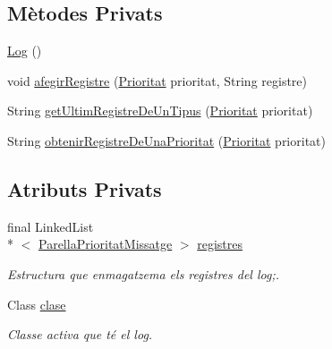 \subsection*{Mètodes Privats}
\begin{DoxyCompactItemize}
\item 
\hyperlink{classlogica_1_1log_1_1_log_adc9a45a8ec3ac28cf225a470febef462}{Log} ()
\item 
void \hyperlink{classlogica_1_1log_1_1_log_a0fd4f6a2a166181957954fd0dbcb516e}{afegir\+Registre} (\hyperlink{enumlogica_1_1log_1_1_log_1_1_prioritat}{Prioritat} prioritat, String registre)
\item 
String \hyperlink{classlogica_1_1log_1_1_log_a9cbdafd1efe82a9210251544c7fce63a}{get\+Ultim\+Registre\+De\+Un\+Tipus} (\hyperlink{enumlogica_1_1log_1_1_log_1_1_prioritat}{Prioritat} prioritat)
\item 
String \hyperlink{classlogica_1_1log_1_1_log_aa79bf08fdc7ff52a24d979d14bb082b0}{obtenir\+Registre\+De\+Una\+Prioritat} (\hyperlink{enumlogica_1_1log_1_1_log_1_1_prioritat}{Prioritat} prioritat)
\end{DoxyCompactItemize}
\subsection*{Atributs Privats}
\begin{DoxyCompactItemize}
\item 
\hypertarget{classlogica_1_1log_1_1_log_a075fe817fdb417775e67909399d8437c}{final Linked\+List\\*
$<$ \hyperlink{classlogica_1_1log_1_1_log_1_1_parella_prioritat_missatge}{Parella\+Prioritat\+Missatge} $>$ \hyperlink{classlogica_1_1log_1_1_log_a075fe817fdb417775e67909399d8437c}{registres}}\label{classlogica_1_1log_1_1_log_a075fe817fdb417775e67909399d8437c}

\begin{DoxyCompactList}\small\item\em Estructura que enmagatzema els registres del log;. \end{DoxyCompactList}\item 
\hypertarget{classlogica_1_1log_1_1_log_af7d3b68ff7c0d75c4bfda5364b37b2ad}{Class \hyperlink{classlogica_1_1log_1_1_log_af7d3b68ff7c0d75c4bfda5364b37b2ad}{clase}}\label{classlogica_1_1log_1_1_log_af7d3b68ff7c0d75c4bfda5364b37b2ad}

\begin{DoxyCompactList}\small\item\em Classe activa que té el log. \end{DoxyCompactList}\end{DoxyCompactItemize}
